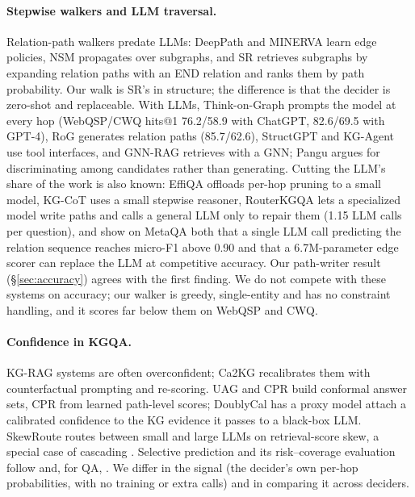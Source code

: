 \documentclass[11pt]{article}
\begin{document}
\paragraph{Stepwise walkers and LLM traversal.} Relation-path walkers predate LLMs:
DeepPath \citep{xiong2017deeppath} and MINERVA \citep{das2018minerva} learn edge
policies, NSM \citep{he2021nsm} propagates over subgraphs, and SR \citep{zhang2022sr}
retrieves subgraphs by expanding relation paths with an END relation and ranks them by
path probability. Our walk is SR's in structure; the difference is that the decider is
zero-shot and replaceable. With LLMs, Think-on-Graph \citep{sun2024tog} prompts the
model at every hop (WebQSP/CWQ hits@1 76.2/58.9 with ChatGPT, 82.6/69.5 with GPT-4), RoG
\citep{luo2024rog} generates relation paths (85.7/62.6), StructGPT
\citep{jiang2023structgpt} and KG-Agent \citep{jiang2025kgagent} use tool interfaces,
and GNN-RAG \citep{mavromatis2024gnnrag} retrieves with a GNN; Pangu
\citep{gu2023pangu} argues for discriminating among candidates rather than generating.
Cutting the LLM's share of the work is also known: EffiQA \citep{dong2025effiqa}
offloads per-hop pruning to a small model, KG-CoT \citep{zhao2024kgcot} uses a small
stepwise reasoner, RouterKGQA \citep{yuan2026routerkgqa} lets a specialized model write
paths and calls a general LLM only to repair them (1.15 LLM calls per question), and
\citet{shrestha2025efficient} show on MetaQA both that a single LLM call predicting the
relation sequence reaches micro-F1 above 0.90 and that a 6.7M-parameter edge scorer can
replace the LLM at competitive accuracy. Our path-writer result (\S\ref{sec:accuracy})
agrees with the first finding. We do not
compete with these systems on accuracy; our walker is greedy, single-entity and has no
constraint handling, and it scores far below them on WebQSP and CWQ.

\paragraph{Confidence in KGQA.} KG-RAG systems are often overconfident; Ca2KG
\citep{ren2026ca2kg} recalibrates them with counterfactual prompting and re-scoring.
UAG \citep{ni2025uag} and CPR \citep{lin2026cpr} build conformal answer sets, CPR from
learned path-level scores; DoublyCal \citep{lu2026doublycal} has a proxy model attach a
calibrated confidence to the KG evidence it passes to a black-box LLM. SkewRoute
\citep{wang2025skewroute} routes between small and large LLMs on retrieval-score skew,
a special case of cascading \citep{dekoninck2025cascade}. Selective prediction and its
risk--coverage evaluation follow \citet{geifman2017selective} and, for QA,
\citet{kamath2020selective}. We differ in the signal (the decider's own per-hop
probabilities, with no training or extra calls) and in comparing it across deciders.
\end{document}

